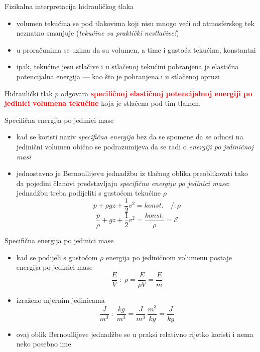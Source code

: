 \documentclass[croatian]{beamer}
\begin{document}
\begin{frame}{Fizikalna interpretacija hidrauličkog tlaka}

\begin{itemize}
\item volumen tekućina se pod tlakovima koji nisu mnogo veći od atmosferskog
tek neznatno smanjuje (\emph{tekućine su praktički nestlačive!})
\item u proračunima se uzima da su volumen, a time i gustoća tekućina, konstantni
\item ipak, tekućine jesu stlačive i u stlačenoj tekućini pohranjena je
elastična potencijalna energija --- kao što je pohranjena i u stlačenoj
opruzi
\end{itemize}

\begin{block}{}
Hidraulički tlak $p$ odgovara \textbf{\textcolor{red}{specifičnoj
elastičnoj potencijalnoj energiji po jedinici volumena tekućine}}
koja je stlačena pod tim tlakom.
\end{block}
\end{frame}

\begin{frame}{Specifična energija po jedinici mase}

\begin{itemize}
\item kad se koristi naziv \emph{specifična energija} bez da se spomene
da se odnosi na jedinični volumen obično se podrazumijeva da se radi
o \emph{energiji po jediničnoj masi}
\item jednostavno je Bernoullijevu jednadžbu iz tlačnog oblika preoblikovati
tako da pojedini članovi predstavljaju \emph{specifičnu energiju po
jedinici mase}: jednadžbu treba podijeliti s gustoćom tekućine $\rho$
\[
p+\rho gz+\frac{1}{2}v^{2}=konst.\quad/:\rho
\]
\[
\frac{p}{\rho}+gz+\frac{1}{2}v^{2}=\frac{konst.}{\rho}=\mathcal{E}
\]
\end{itemize}
\end{frame}

\begin{frame}{Specifična energija po jedinici mase}

\begin{itemize}
\item kad se podijeli s gustoćom $\rho$ energija po jediničnom volumenu
postaje energija po jedinici mase
\[
\frac{E}{V}\;:\;\rho=\frac{E}{\rho V}=\frac{E}{m}
\]
\item izraženo mjernim jedinicama
\[
\frac{J}{m^{3}}\;:\;\frac{kg}{m^{3}}=\frac{J}{m^{3}}\:\frac{m^{3}}{kg}=\frac{J}{kg}
\]
\item ovaj oblik Bernoullijeve jednadžbe se u praksi relativno rijetko koristi
i nema neko posebno ime
\end{itemize}
\end{frame}
\end{document}
